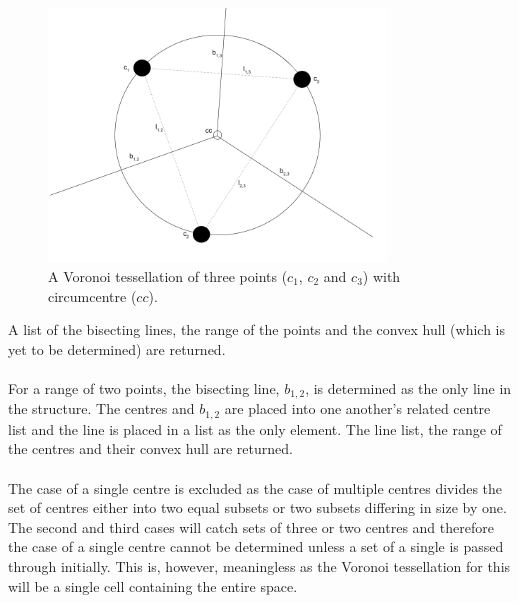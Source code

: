 \begin{figure}[H]
\centering
\includegraphics[width=0.8\textwidth]{Images/vor_triangle.png}
\caption{A Voronoi tessellation of three points ($c_1$, $c_2$ and $c_3$) with circumcentre ($cc$).}
\label{fig:vor_triangle}
\end{figure}
A list of the bisecting lines, the range of the points and the convex hull (which is yet to be determined) are returned.
\\
\\
For a range of two points, the bisecting line, $b_{1,2}$, is determined as the only line in the structure. The centres and $b_{1,2}$ are placed into one another's related centre list and the line is placed in a list as the only element. The line list, the range of the centres and their convex hull are returned.
\\
\\
The case of a single centre is excluded as the case of multiple centres divides the set of centres either into two equal subsets or two subsets differing in size by one. The second and third cases will catch sets of three or two centres and therefore the case of a single centre cannot be determined unless a set of a single is passed through initially. This is, however, meaningless as the Voronoi tessellation for this will be a single cell containing the entire space.

